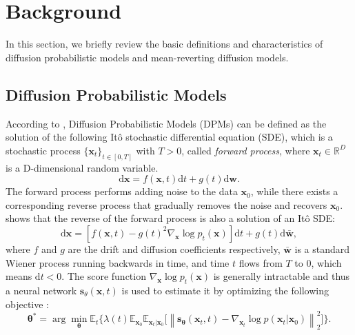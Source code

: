 \section{Background}

In this section, we briefly review the basic definitions and characteristics of diffusion probabilistic models and mean-reverting diffusion models.

\subsection{Diffusion Probabilistic Models}

According to \cite{song2020sde}, Diffusion Probabilistic Models (DPMs) can be defined as the solution of the following Itô stochastic differential equation (SDE), which is a stochastic process $\{\boldsymbol{x}_t\}_{t\in [0,T]}$ with $T>0$, called \textit{forward process}, where $\boldsymbol{x}_t\in \mathbb{R}^D$ is a D-dimensional random variable.
\begin{equation}
    \mathrm{d}\boldsymbol{x}=f(\boldsymbol{x},t)\mathrm{d}t + g(t) \mathrm{d}\boldsymbol{w}. \label{1}
\end{equation}
The forward process performs adding noise to the data $\boldsymbol{x}_0$, while there exists a corresponding reverse process that gradually removes the noise and recovers $\boldsymbol{x}_0$. \cite{anderson1982reverse} shows that the reverse of the forward process is also a solution of an Itô SDE:
\begin{equation}
    \mathrm{d}\boldsymbol{x}=[f(\boldsymbol{x},t)-g(t)^2\nabla_{\boldsymbol{x}}\log{p_t(\boldsymbol{x})}]\mathrm{d}t + g(t)\mathrm{d}\bar{\boldsymbol{w}}, \label{2}
\end{equation}
where $f$ and $g$ are the drift and diffusion coefficients respectively, $\bar{\boldsymbol{w}}$ is a standard Wiener process running backwards in time, and time $t$ flows from $T$ to $0$, which means $\mathrm{d}t<0$. The score function $\nabla_{\boldsymbol{x}}\log{p_t(\boldsymbol{x})}$ is generally intractable and thus a neural network $\boldsymbol{s}_\theta(\boldsymbol{x},t)$ is used to estimate it by optimizing the following objective \citep{song2020sde,hyvarinen2005scorematch}:
\begin{equation}
    \boldsymbol{\theta}^{*}=\arg\min_{\boldsymbol{\theta}}\mathbb{E}_{t}\Big\{\lambda(t)\mathbb{E}_{\boldsymbol{x}_0}\mathbb{E}_{\boldsymbol{x}_t|\boldsymbol{x}_0}\Big[\left\|\boldsymbol{s}_{\boldsymbol{\theta}}(\boldsymbol{x}_t,t)-\nabla_{\boldsymbol{x}_t}\log p(\boldsymbol{x}_t|\boldsymbol{x}_0)\right\|_{2}^{2}\Big]\Big\}.
    \label{3}
\end{equation}
